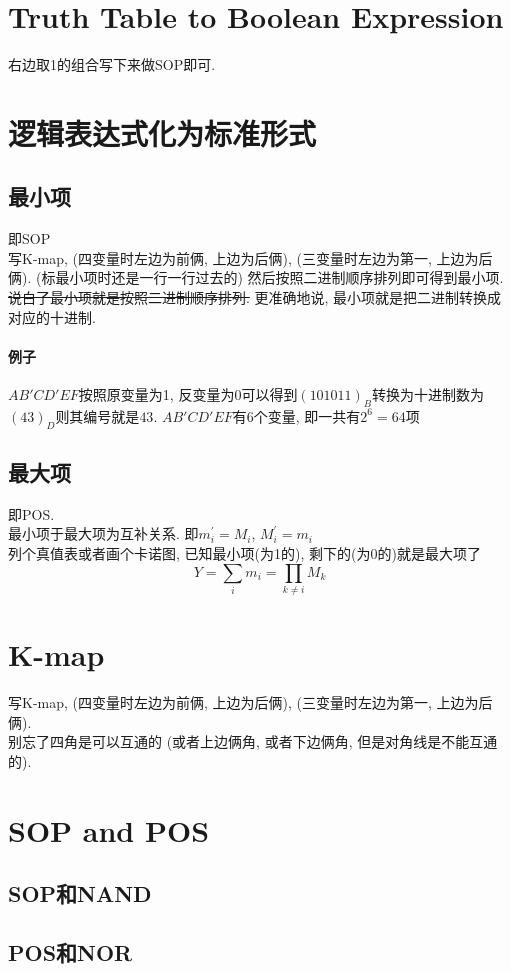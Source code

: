 \documentclass[scheme=chinese,a4paper]{report}
\begin{document}
\section{Truth Table to Boolean Expression}
右边取1的组合写下来做SOP即可. 
\section{逻辑表达式化为标准形式}
\subsection{最小项}
即SOP\\
写K-map, (四变量时左边为前俩, 上边为后俩), (三变量时左边为第一, 上边为后俩).
(标最小项时还是一行一行过去的)
然后按照二进制顺序排列即可得到最小项. \\
\sout{说白了最小项就是按照二进制顺序排列.} 更准确地说, 最小项就是把二进制转换成对应的十进制. 
\paragraph{例子} $AB'CD'EF$按照原变量为1, 反变量为0可以得到$(101011)_B$转换为十进制数为$(43)_D$则其编号就是$43$. $AB'CD'EF$有6个变量, 即一共有$2^6=64$项
\subsection{最大项}
即POS. \\
最小项于最大项为互补关系. 即$m_i^\prime=M_i$, $M_i^\prime=m_i$\\
列个真值表或者画个卡诺图, 已知最小项(为1的), 剩下的(为0的)就是最大项了\\
$$Y=\sum_{i} m_i=\prod_{k\neq i} M_k$$
\section{K-map}
写K-map, (四变量时左边为前俩, 上边为后俩), (三变量时左边为第一, 上边为后俩).\\
别忘了四角是可以互通的 (或者上边俩角, 或者下边俩角, 但是对角线是不能互通的). 
\section{SOP and POS}
\subsection{SOP和NAND}
\subsection{POS和NOR}
\end{document}
